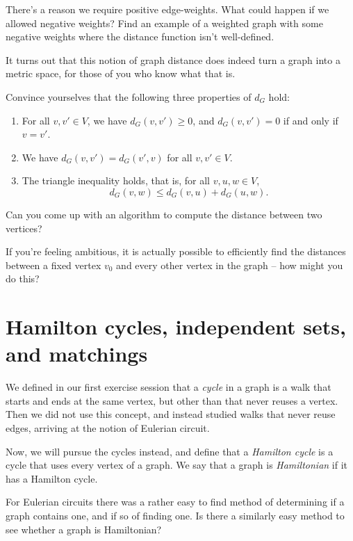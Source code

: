 \documentclass[nobib]{tufte-handout}
\begin{document}
\begin{xca}
  There's a reason we require positive edge-weights. What could happen if we allowed negative weights? Find an example of a weighted graph with some negative weights where the distance function isn't well-defined.
\end{xca}

It turns out that this notion of graph distance does indeed turn a graph into a metric space, for those of you who know what that is.

\begin{xca}
  Convince yourselves that the following three properties of $d_G$ hold:
  \begin{enumerate}
    \item For all $v, v' \in V$, we have $d_G(v, v') \geq 0$, and $d_G(v,v') = 0$ if and only if $v = v'$.
    \item We have $d_G(v,v') = d_G(v',v)$ for all $v, v' \in V$.
    \item The triangle inequality holds, that is, for all $v, u, w \in V$,
    $$d_G(v, w) \leq d_G(v, u) + d_G(u, w).$$
  \end{enumerate}
\end{xca}

\begin{xca}
  Can you come up with an algorithm to compute the distance between two vertices?

  If you're feeling ambitious, it is actually possible to efficiently find the distances between a fixed vertex $v_0$ and every other vertex in the graph -- how might you do this?
\end{xca}

\section{Hamilton cycles, independent sets, and matchings}

We defined in our first exercise session that a \emph{cycle} in a graph is a walk that starts and ends at the same vertex, but other than that never reuses a vertex. Then we did not use this concept, and instead studied walks that never reuse edges, arriving at the notion of Eulerian circuit.

Now, we will pursue the cycles instead, and define that a \emph{Hamilton cycle} is a cycle that uses every vertex of a graph. We say that a graph is \emph{Hamiltonian} if it has a Hamilton cycle.

\begin{xca}
  For Eulerian circuits there was a rather easy to find method of determining if a graph contains one, and if so of finding one. Is there a similarly easy method to see whether a graph is Hamiltonian?
\end{xca}
\end{document}
